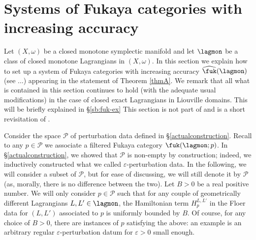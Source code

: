 \newpage
\section{Systems of Fukaya categories with increasing accuracy}\label{sysnew}

Let $(X,\omega)$ be a closed monotone symplectic manifold and let $\lagmon$ be a class of closed monotone Lagrangians in $(X,\omega)$. In this section we explain how to set up a system of Fukaya categories with increasing accuracy $\widehat{\fuk}(\lagmon)$ (see ...) appearing in the statement of Theorem \ref{thmA}. We remark that all what is contained in this section continues to hold (with the adequate usual modifications) in the case of closed exact Lagrangians in Liouville domains. This will be briefly explained in \S\ref{sb:fuk-ex} This section is not part of \cite{Amb:fil-fuk} and is a short revisitation of \cite[Section 2.6.6]{ABC26}.

Consider the space $\mathcal{P}$ of perturbation data defined in \S \ref{actualconstruction}. Recall to any $p\in \mathcal{P}$ we associate a filtered Fukaya category $\fuk(\lagmon;p)$. In \S\ref{actualconstruction}, we showed that $\mathcal{P}$ is non-empty by construction; indeed, we inductively constructed what we called $\varepsilon$-perturbation data. In the following, we will consider a subset of $\mathcal{P}$, but for ease of discussing, we will still denote it by $\mathcal{P}$ (as, morally, there is no difference between the two). Let $B>0$ be a real positive number. We will only consider $p\in \mathcal{P}$ such that for any couple of geometrically different Lagrangians $L,L'\in \lagmon$, the Hamiltonian term $H^{L,L'}_p$ in the Floer data for $(L,L')$ associated to $p$ is uniformly bounded by $B$. Of course, for any choice of $B>0$, there are instances of $p$ satisfying the above: an example is an arbitrary regular $\varepsilon$-perturbation datum for $\varepsilon>0$ small enough. 

